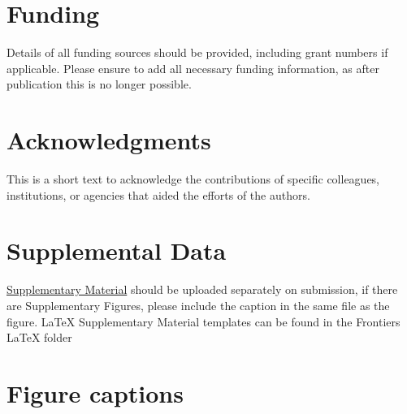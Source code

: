 \documentclass[utf8]{frontiersSCNS} %
\begin{document}
\section*{Funding}
Details of all funding sources should be provided, including grant numbers if
applicable. Please ensure to add all necessary funding information, as after
publication this is no longer possible.

\section*{Acknowledgments}
This is a short text to acknowledge the contributions of specific colleagues,
institutions, or agencies that aided the efforts of the authors.

\section*{Supplemental Data}
\href{http://home.frontiersin.org/about/author-guidelines#SupplementaryMaterial}{Supplementary
Material} should be uploaded separately on submission, if there are
Supplementary Figures, please include the caption in the same file as the
figure. LaTeX Supplementary Material templates can be found in the Frontiers
LaTeX folder





\section*{Figure captions}

\end{document}
